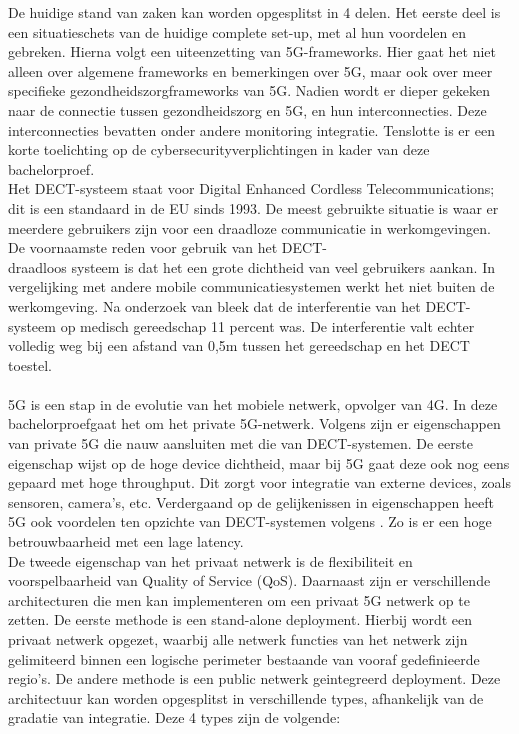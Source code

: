 De huidige stand van zaken kan worden opgesplitst in 4 delen. Het eerste deel is een situatieschets van de huidige complete set-up, met al hun voordelen en gebreken. Hierna volgt een uiteenzetting van 5G-frameworks. Hier gaat het niet alleen over algemene frameworks en bemerkingen over 5G, maar ook over meer specifieke gezondheidszorgframeworks van 5G. Nadien wordt er dieper gekeken naar de connectie tussen gezondheidszorg en 5G, en hun interconnecties. Deze interconnecties bevatten onder andere monitoring integratie. Tenslotte is er een korte toelichting op de cybersecurityverplichtingen in kader van deze bachelorproef.
\\
Het DECT-systeem staat voor Digital Enhanced Cordless Telecommunications; dit is een standaard in de EU sinds 1993. De meest gebruikte situatie is waar er meerdere gebruikers zijn voor een draadloze communicatie in werkomgevingen. De voornaamste reden voor gebruik van het DECT-\\draadloos systeem is dat het een grote dichtheid van veel gebruikers aankan. In vergelijking met andere mobile communicatiesystemen werkt het niet buiten de werkomgeving. \autocite{Welinder1997} Na onderzoek van \textcite{Welinder1997} bleek dat de interferentie van het DECT-systeem op medisch gereedschap 11 percent was. De interferentie valt echter volledig weg bij een afstand van 0,5m tussen het gereedschap en het DECT toestel.
\\\\
5G is een stap in de evolutie van het mobiele netwerk, opvolger van 4G. In deze bachelorproefgaat het om het private 5G-netwerk. Volgens \textcite{wen2021private} zijn er eigenschappen van private 5G die nauw aansluiten met die van DECT-systemen. De eerste eigenschap wijst op de hoge device dichtheid, maar bij 5G gaat deze ook nog eens gepaard met hoge throughput. Dit zorgt voor integratie van externe devices, zoals sensoren, camera's, etc. Verdergaand op de gelijkenissen in eigenschappen heeft 5G ook voordelen ten opzichte van DECT-systemen volgens \textcite{wen2021private}. Zo is er een hoge betrouwbaarheid met een lage latency.\\ De tweede eigenschap van het privaat netwerk is de flexibiliteit en voorspelbaarheid van Quality of Service (QoS). Daarnaast zijn er verschillende architecturen die men kan implementeren om een privaat 5G netwerk op te zetten. De eerste methode is een stand-alone deployment. Hierbij wordt een privaat netwerk opgezet, waarbij alle netwerk functies van het netwerk zijn gelimiteerd binnen een logische perimeter bestaande van vooraf gedefinieerde regio's. De andere methode is een public netwerk geintegreerd deployment. Deze architectuur kan worden opgesplitst in verschillende types, afhankelijk van de gradatie van integratie. Deze 4 types zijn de volgende:

